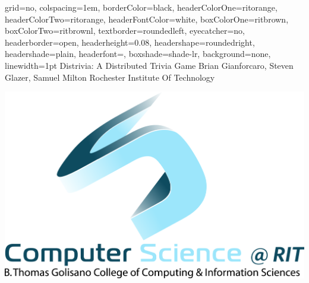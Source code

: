 \documentclass[landscape,a0paper,final,showframe]{baposter}
\begin{document}
\begin{poster}{
  grid=no,
  colspacing=1em,
  borderColor=black,
  headerColorOne=ritorange,
  headerColorTwo=ritorange,
  headerFontColor=white,
  boxColorOne=ritbrown,
  boxColorTwo=ritbrownl,
  textborder=roundedleft,
  eyecatcher=no,
  headerborder=open,
  headerheight=0.08\textheight,
  headershape=roundedright,
  headershade=plain,
  headerfont=\Large\textsf, %
  boxshade=shade-lr,
  background=none,
  linewidth=1pt
  }
  {} %
  {\sf %
  Distrivia: A Distributed Trivia Game}
  {\sf %
  Brian Gianforcaro, Steven Glazer, Samuel Milton\hspace{3em}
  Rochester Institute Of Technology
  }
  {{\begin{minipage}{16em}
    \hfill
    \includegraphics[scale=0.1]{logo}
  \end{minipage}}
  }


     \newlength{\leftimgwidth}
     \setlength{\leftimgwidth}{0.78em+8.0em}


\end{poster}
\end{document}
